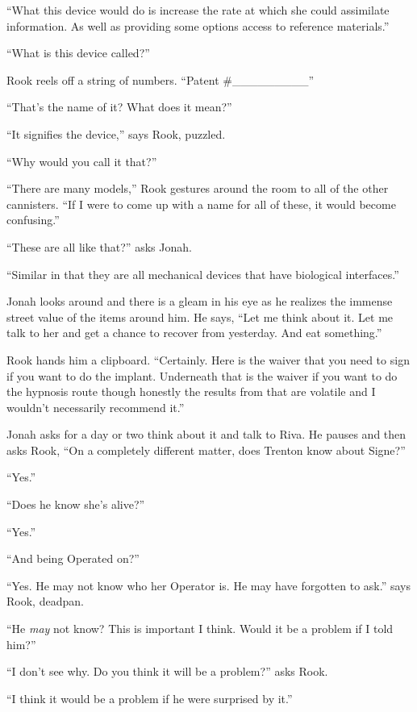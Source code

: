 ``What this device would do is increase the rate at which she could assimilate information.  As well as providing some options access to reference materials.''

``What is this device called?''

Rook reels off a string of numbers.  ``Patent \#\_\_\_\_\_\_\_\_\_''

``That's the name of it? What does it mean?''

``It signifies the device,'' says Rook, puzzled.

``Why would you call it that?''

``There are many models,'' Rook gestures around the room to all of the other cannisters.  ``If I were to come up with a name for all of these, it would become confusing.''

``These are all like that?'' asks Jonah.

``Similar in that they are all mechanical devices that have biological interfaces.''

Jonah looks around and there is a gleam in his eye as he realizes the immense street value of the items around him.  He says, ``Let me think about it.  Let me talk to her and get a chance to recover from yesterday.  And eat something.''

Rook hands him a clipboard.  ``Certainly.  Here is the waiver that you need to sign if you want to do the implant.   Underneath that is the waiver if you want to do the hypnosis route though honestly the results from that are volatile and I wouldn't necessarily recommend it.''



Jonah asks for a day or two think about it and talk to Riva.   He pauses and then asks Rook, ``On a completely different matter, does Trenton know about Signe?''

``Yes.''

``Does he know she's alive?''

``Yes.''

``And being Operated on?''

``Yes.  He may not know who her Operator is.  He may have forgotten to ask.'' says Rook, deadpan.

``He \textit{may} not know?  This is important I think.  Would it be a problem if I told him?''

``I don't see why.  Do you think it will be a problem?'' asks Rook.

``I think it would be a problem if he were surprised by it.''

